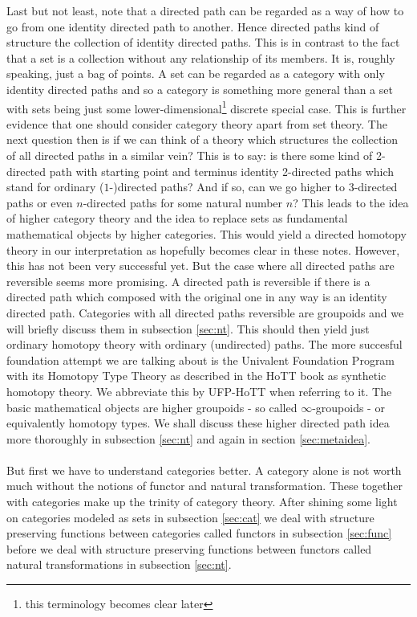 Last but not least, note that a directed path can be regarded as a way of how to go from one identity directed path to another. Hence directed paths kind of structure the collection of identity directed paths. This is in contrast to the fact that a set is a collection without any relationship of its members. It is, roughly speaking, just a bag of points. A set can be regarded as a category with only identity directed paths and so a category is something more general than a set with sets being just some lower-dimensional\footnote{this terminology becomes clear later} discrete special case. This is further evidence that one should consider category theory apart from set theory. The next question then is if we can think of a theory which structures the collection of all directed paths in a similar vein? This is to say: is there some kind of 2-directed path with starting point and terminus identity 2-directed paths which stand for ordinary ($1$-)directed paths? And if so, can we go higher to $3$-directed paths or even $n$-directed paths for some natural number $n$? This leads to the idea of higher category theory and the idea to replace sets as fundamental mathematical objects by higher categories. This would yield a {\glqq}directed homotopy theory{\glqq} in our interpretation as hopefully becomes clear in these notes. However, this has not been very successful yet. But the case where all directed paths are reversible seems more promising. A directed path is reversible if there is a directed path which composed with the original one in any way is an identity directed path. Categories with all directed paths reversible are groupoids and we will briefly discuss them in subsection \ref{sec:nt}. This should then yield just ordinary homotopy theory with ordinary (undirected) paths. The more succesful foundation attempt we are talking about is the Univalent Foundation Program with its Homotopy Type Theory as described in the HoTT book \cite{1ba1603e} as {\glqq}synthetic{\grqq} homotopy theory. We abbreviate this by UFP-HoTT when referring to it. The basic mathematical objects are higher groupoids - so called $\infty$-groupoids - or equivalently homotopy types. We shall discuss these higher directed path idea more thoroughly in subsection \ref{sec:nt} and again in section \ref{sec:metaidea}.
\\\\
But first we have to understand categories better. A category alone is not worth much without the notions of functor and natural transformation. These together with categories make up the trinity of category theory. After shining some light on categories modeled as sets in subsection \ref{sec:cat} we deal with structure preserving functions between categories called functors in subsection \ref{sec:func} before we deal with structure preserving functions between functors called natural transformations in subsection \ref{sec:nt}.
